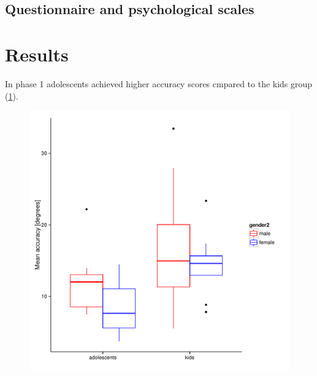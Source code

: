 \documentclass[man]{apa}
\begin{document}
\subsection{Questionnaire and psychological scales}

\section{Results}

In phase 1 adolescents achieved higher accuracy scores cmpared to the kids group (\ref{fig:F1}).

\begin{figure}[h]
\includegraphics{Figure_1}
\caption{}
\label{fig:F1}
\end{figure}
\end{document}
